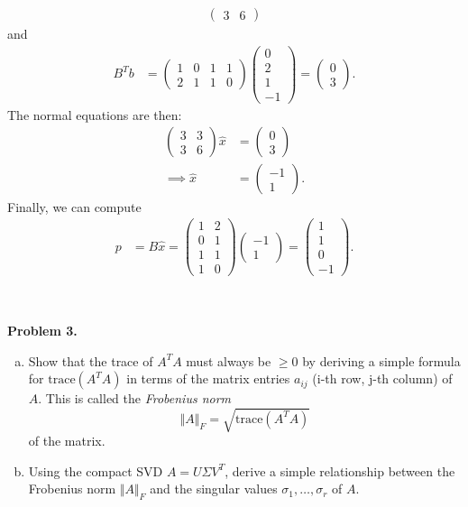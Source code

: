 \documentclass[11pt]{article}
\begin{document}
\begin{enumerate}[(a)]
\begin{align*}
\begin{pmatrix}
3 & 6
\end{pmatrix}
\end{align*}
 and 
\begin{align*}
B^{T}b & =\begin{pmatrix}1 & 0 & 1 & 1\\
2 & 1 & 1 & 0
\end{pmatrix}\begin{pmatrix}0\\
2\\
1\\
-1
\end{pmatrix}=\begin{pmatrix}0\\
3
\end{pmatrix}.
\end{align*}
The normal equations are then:
\begin{align*}
\begin{pmatrix}3 & 3\\
3 & 6
\end{pmatrix}\hat{x} & =\begin{pmatrix}0\\
3
\end{pmatrix}\\
\implies\hat{x} & =\begin{pmatrix}-1\\
1
\end{pmatrix}.
\end{align*}
Finally, we can compute
\begin{align*}
p & =B\hat{x}=\begin{pmatrix}1 & 2\\
0 & 1\\
1 & 1\\
1 & 0
\end{pmatrix}\begin{pmatrix}-1\\
1
\end{pmatrix}=\begin{pmatrix}1\\
1\\
0\\
-1
\end{pmatrix}.
\end{align*}
\end{enumerate}


\

\noindent \textbf{Problem 3.}\\
\begin{enumerate}[(a)]
\item Show that the trace of $A^T A$ must always be $\ge 0$ by deriving a simple formula for $\mbox{trace}(A^T A)$ in terms of the matrix entries $a_{ij}$ (i-th row, j-th column) of $A$.  This is called the \emph{Frobenius norm} $$\Vert A \Vert_F = \sqrt{\mbox{trace}(A^T A)}$$ of the matrix.
\item Using the compact SVD $A = U\Sigma V^T$, derive a simple relationship between the Frobenius norm $\Vert A \Vert_F$ and the singular values $\sigma_1, \ldots, \sigma_r$ of $A$.  
\end{enumerate}
\end{document}
